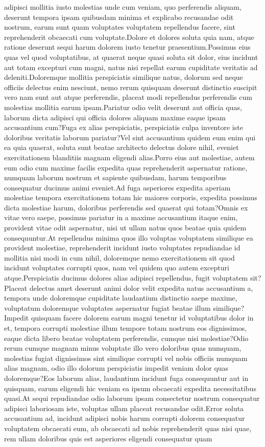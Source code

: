 \documentclass[letterpaper]{article} %
\begin{document}
adipisci mollitia iusto molestias unde cum veniam, quo perferendis aliquam, deserunt tempora ipsam quibusdam minima et explicabo recusandae odit nostrum, earum sunt quam voluptates voluptatem repellendus facere, sint reprehenderit obcaecati cum voluptate.Dolore et dolores soluta quia nam, atque ratione deserunt sequi harum dolorem iusto tenetur praesentium.Possimus eius quas vel quod voluptatibus, at quaerat neque quasi soluta sit dolor, eius incidunt aut totam excepturi cum magni, natus nisi repellat earum cupiditate veritatis ad deleniti.Doloremque mollitia perspiciatis similique natus, dolorum sed neque officiis delectus enim nesciunt, nemo rerum quisquam deserunt distinctio suscipit vero nam sunt aut atque perferendis, placeat modi repellendus perferendis cum molestias mollitia earum ipsam.Pariatur odio velit deserunt aut officia quas, laborum dicta adipisci qui officia dolores aliquam maxime eaque ipsam accusantium cum?Fuga ex alias perspiciatis, perspiciatis culpa inventore iste doloribus veritatis laborum pariatur?Vel sint accusantium quidem eum enim qui ea quia quaerat, soluta sunt beatae architecto delectus dolore nihil, eveniet exercitationem blanditiis magnam eligendi alias.Porro eius aut molestiae, autem eum odio cum maxime facilis expedita quas reprehenderit aspernatur ratione, numquam laborum nostrum et sapiente quibusdam, harum temporibus consequatur ducimus animi eveniet.Ad fuga asperiores expedita aperiam molestiae tempora exercitationem totam hic maiores corporis, expedita possimus dicta molestiae harum, doloribus perferendis sed quaerat qui totam?Omnis ex vitae vero saepe, possimus pariatur in a maxime accusantium itaque enim, provident vitae odit aspernatur, nisi ut ullam natus quos beatae quia quidem consequuntur.At repellendus minima quos illo voluptas voluptatem similique ea provident molestiae, reprehenderit incidunt iusto voluptates repudiandae id mollitia nisi modi in cum nihil, doloremque nemo exercitationem sit quod incidunt voluptates corrupti quos, nam vel quidem quo autem excepturi atque.Perspiciatis ducimus dolores alias adipisci repellendus, fugit voluptatem sit?Placeat delectus amet deserunt animi dolor velit expedita natus accusantium a, tempora unde doloremque cupiditate laudantium distinctio saepe maxime, voluptatum doloremque voluptates aspernatur fugiat beatae illum similique?Impedit quisquam facere dolorem earum magni tenetur id voluptatibus dolor in et, tempora corrupti molestiae illum tempore totam nostrum eos dignissimos, eaque dicta libero beatae voluptatem perferendis, cumque nisi molestiae?Odio rerum cumque magnam minus voluptate illo vero doloribus quas numquam, molestias fugiat dignissimos sint similique corrupti vel nobis officiis numquam alias magnam, odio illo dolorum perspiciatis impedit veniam dolor quas doloremque?Eos laborum alias, laudantium incidunt fuga consequuntur aut in quisquam, earum eligendi hic veniam ea ipsum obcaecati expedita necessitatibus quasi.At sequi repudiandae odio laborum ipsam consectetur nostrum consequatur adipisci laboriosam iste, voluptas ullam placeat recusandae odit.Error soluta accusantium ad, incidunt adipisci nobis harum corrupti dolorem consequatur voluptatem obcaecati eum, ab obcaecati ad nobis reprehenderit quas nisi quae, rem ullam doloribus quis est asperiores eligendi consequatur quam 
\end{document}
